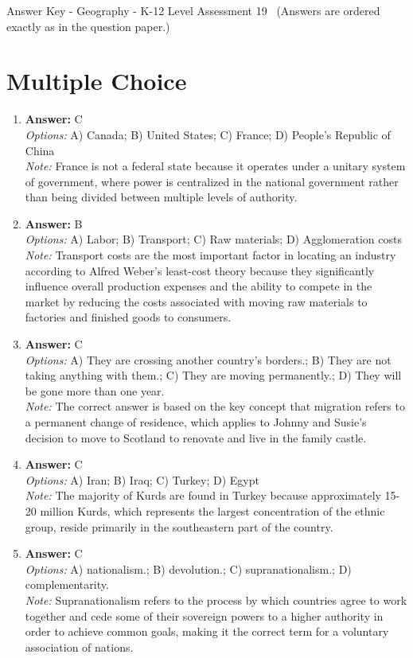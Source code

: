 \documentclass[12pt]{article}
\begin{document}
\begin{center}
Answer Key - Geography - K-12 Level Assessment 19 \
\small (Answers are ordered exactly as in the question paper.)
\end{center}

\section*{Multiple Choice}
\begin{enumerate}[label=\arabic*.]
\item \textbf{Answer:} C
\\ \textit{Options:} A) Canada; B) United States; C) France; D) People's Republic of China
\\ \textit{Note:} France is not a federal state because it operates under a unitary system of government, where power is centralized in the national government rather than being divided between multiple levels of authority.
\item \textbf{Answer:} B
\\ \textit{Options:} A) Labor; B) Transport; C) Raw materials; D) Agglomeration costs
\\ \textit{Note:} Transport costs are the most important factor in locating an industry according to Alfred Weber's least-cost theory because they significantly influence overall production expenses and the ability to compete in the market by reducing the costs associated with moving raw materials to factories and finished goods to consumers.
\item \textbf{Answer:} C
\\ \textit{Options:} A) They are crossing another country's borders.; B) They are not taking anything with them.; C) They are moving permanently.; D) They will be gone more than one year.
\\ \textit{Note:} The correct answer is based on the key concept that migration refers to a permanent change of residence, which applies to Johnny and Susie's decision to move to Scotland to renovate and live in the family castle.
\item \textbf{Answer:} C
\\ \textit{Options:} A) Iran; B) Iraq; C) Turkey; D) Egypt
\\ \textit{Note:} The majority of Kurds are found in Turkey because approximately 15-20 million Kurds, which represents the largest concentration of the ethnic group, reside primarily in the southeastern part of the country.
\item \textbf{Answer:} C
\\ \textit{Options:} A) nationalism.; B) devolution.; C) supranationalism.; D) complementarity.
\\ \textit{Note:} Supranationalism refers to the process by which countries agree to work together and cede some of their sovereign powers to a higher authority in order to achieve common goals, making it the correct term for a voluntary association of nations.
\end{enumerate}
\end{document}
